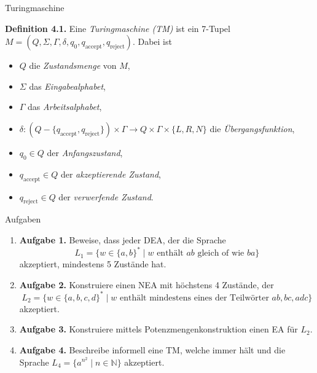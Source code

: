 \documentclass[11pt,aspectratio=169]{beamer}
\begin{document}
\begin{frame}{Turingmaschine}

\textbf{Definition 4.1.}
Eine \textit{Turingmaschine (TM)} ist ein 7-Tupel
\(M = (Q, \Sigma, \Gamma, \delta, q_0, q_{\text{accept}}, q_{\text{reject}})\).
Dabei ist

\begin{itemize}
    \item \(Q\) die \textit{Zustandsmenge} von \(M\),
    \item \(\Sigma\) das \textit{Eingabealphabet},
    \item \(\Gamma\) das \textit{Arbeitsalphabet},
    \item \(\delta : (Q - \{q_{\text{accept}}, q_{\text{reject}}\}) \times \Gamma
        \to Q \times \Gamma \times \{L, R, N\}\) die \textit{Übergangsfunktion},
    \item \(q_0 \in Q\) der \textit{Anfangszustand},
    \item \(q_{\text{accept}} \in Q\) der \textit{akzeptierende Zustand},
    \item \(q_{\text{reject}} \in Q\) der \textit{verwerfende Zustand}.
\end{itemize}

\end{frame}


\begin{frame}{Aufgaben}
    \begin{enumerate}
        \justifying
        \item \textbf{Aufgabe 1.}
            Beweise, dass jeder DEA, der die Sprache
            \[
                L_1 = \{w \in \{a, b\}^* \mid w \text{ enthält } ab \text{ gleich of wie } ba\}
            \]
            akzeptiert, mindestens 5 Zustände hat.
        \item \textbf{Aufgabe 2.}
            Konstruiere einen NEA mit höchstens 4 Zustände, der
            \[
                L_2 = \{w \in \{a, b, c, d\}^* \mid w \text{ enthält mindestens eines der Teilwörter } ab, bc, adc\}
            \]
            akzeptiert.
        \item \textbf{Aufgabe 3.}
            Konstruiere mittels Potenzmengenkonstruktion einen EA für \(L_2\).
        \item \textbf{Aufgabe 4.}
            Beschreibe informell eine TM, welche immer hält und die Sprache
            \(L_4 = \{a^{n^2} \mid n \in \mathbb N \}\) akzeptiert.
    \end{enumerate}
\end{frame}
\end{document}
